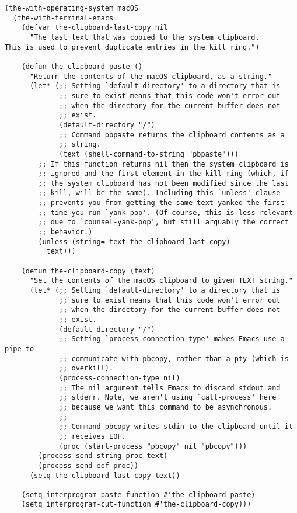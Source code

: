 \documentclass[11pt]{article}
\begin{document}
\begin{verbatim}
(the-with-operating-system macOS
  (the-with-terminal-emacs
    (defvar the-clipboard-last-copy nil
      "The last text that was copied to the system clipboard.
This is used to prevent duplicate entries in the kill ring.")

    (defun the-clipboard-paste ()
      "Return the contents of the macOS clipboard, as a string."
      (let* (;; Setting `default-directory' to a directory that is
             ;; sure to exist means that this code won't error out
             ;; when the directory for the current buffer does not
             ;; exist.
             (default-directory "/")
             ;; Command pbpaste returns the clipboard contents as a
             ;; string.
             (text (shell-command-to-string "pbpaste")))
        ;; If this function returns nil then the system clipboard is
        ;; ignored and the first element in the kill ring (which, if
        ;; the system clipboard has not been modified since the last
        ;; kill, will be the same). Including this `unless' clause
        ;; prevents you from getting the same text yanked the first
        ;; time you run `yank-pop'. (Of course, this is less relevant
        ;; due to `counsel-yank-pop', but still arguably the correct
        ;; behavior.)
        (unless (string= text the-clipboard-last-copy)
          text)))

    (defun the-clipboard-copy (text)
      "Set the contents of the macOS clipboard to given TEXT string."
      (let* (;; Setting `default-directory' to a directory that is
             ;; sure to exist means that this code won't error out
             ;; when the directory for the current buffer does not
             ;; exist.
             (default-directory "/")
             ;; Setting `process-connection-type' makes Emacs use a pipe to
             ;; communicate with pbcopy, rather than a pty (which is
             ;; overkill).
             (process-connection-type nil)
             ;; The nil argument tells Emacs to discard stdout and
             ;; stderr. Note, we aren't using `call-process' here
             ;; because we want this command to be asynchronous.
             ;;
             ;; Command pbcopy writes stdin to the clipboard until it
             ;; receives EOF.
             (proc (start-process "pbcopy" nil "pbcopy")))
        (process-send-string proc text)
        (process-send-eof proc))
      (setq the-clipboard-last-copy text))

    (setq interprogram-paste-function #'the-clipboard-paste)
    (setq interprogram-cut-function #'the-clipboard-copy)))
\end{verbatim}
\end{document}

